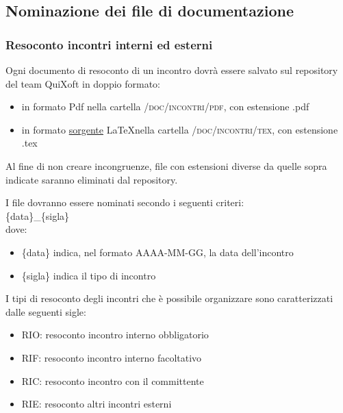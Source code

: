 \documentclass[11pt,a4paper]{article}
\begin{document}
\subsection{Nominazione dei file di documentazione}
\subsubsection{Resoconto incontri interni ed esterni}
Ogni documento di resoconto di un incontro dovrà essere salvato sul repository del team QuiXoft in doppio formato:
\begin{itemize}
	\item in formato Pdf nella cartella \textsc{/doc/incontri/pdf}, con estensione .pdf
	\item in formato \underline{sorgente} \LaTeX \space nella cartella \textsc{/doc/incontri/tex}, con estensione .tex
\end{itemize}
Al fine di non creare incongruenze, file con estensioni diverse da quelle sopra indicate saranno eliminati dal repository.

I file dovranno essere nominati secondo i seguenti criteri: \\

\{data\}\_\{sigla\} \\

dove:

\begin{itemize}
	\item \{data\} indica, nel formato AAAA-MM-GG, la data dell'incontro
	\item \{sigla\} indica il tipo di incontro
\end{itemize}
\bigskip \medskip
I tipi di resoconto degli incontri che è possibile organizzare sono caratterizzati dalle seguenti sigle:

\begin{itemize}
	\item RIO: resoconto incontro interno obbligatorio
	\item RIF: resoconto incontro interno facoltativo
	\item RIC: resoconto incontro con il committente
	\item RIE: resoconto altri incontri esterni
\end{itemize}
\end{document}
